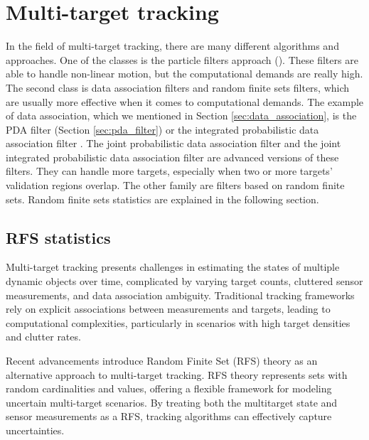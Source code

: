 \section{Multi-target tracking}
In the field of multi-target tracking, there are many different algorithms and approaches. One of the classes is the
particle filters approach (\cite{Particle_Khan2005, Particle_Gustafsson2002, Particle_Doucet2001,
    nonlinearParticleFilter}). These filters are able to handle non-linear motion, but the computational demands are
really high. The second class is data association filters and random finite sets filters, which are usually more
effective when it comes to computational
demands. The example of data association, which we mentioned in Section \ref{sec:data_association}, is the PDA filter
(Section \ref{sec:pda_filter}) or the integrated probabilistic data association filter \cite{brekke}. The joint
probabilistic
data association filter \cite{BarShalomPDA} and the joint integrated probabilistic data association filter \cite{brekke} are advanced
versions
of these
filters. They can handle more targets, especially when two or more targets' validation regions overlap. The other
family are filters based on random finite sets. Random finite sets statistics are explained in the following section.
    \subsection{RFS statistics}
Multi-target tracking presents challenges in estimating the states of multiple dynamic objects over time, complicated
by varying target counts, cluttered sensor measurements, and data association ambiguity. Traditional tracking
frameworks rely on explicit \linebreak associations between measurements and targets, leading to computational complexities, particularly in scenarios with high target densities and clutter rates.

Recent advancements introduce Random Finite Set (RFS) theory as an alternative approach to multi-target tracking. RFS
theory represents sets with random cardinalities and values, offering a flexible framework for modeling uncertain
multi-target scenarios. By treating both the multitarget state and sensor measurements as a RFS, tracking algorithms
can effectively capture uncertainties.

